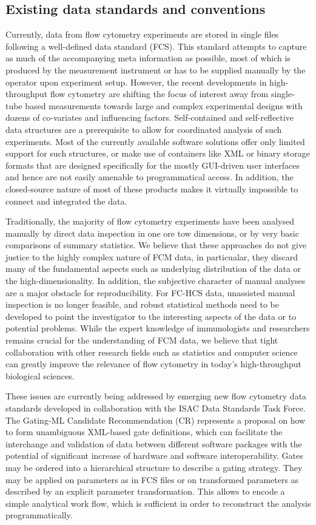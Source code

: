 \documentclass[12pt]{article}
\begin{document}
\subsection*{Existing data standards and conventions}
Currently, data from flow cytometry experiments are stored in single
files following a well-defined data standard (FCS). This standard
attempts to capture as much of the accompanying meta information as
possible, most of which is produced by the measurement instrument or
has to be supplied manually by the operator upon experiment
setup. However, the recent developments in high-throughput flow
cytometry are shifting the focus of interest away from single-tube
based measurements towards large and complex experimental designs with
dozens of co-variates and influencing factors. Self-contained and
self-reflective data structures are a prerequisite to allow for
coordinated analysis of such experiments. Most of the currently
available software solutions offer only limited support for such
structures, or make use of containers like XML or binary storage
formats that are designed specifically for the mostly GUI-driven user
interfaces and hence are not easily amenable to programmatical
access. In addition, the closed-source nature of most of these
products makes it virtually impossible to connect and integrated the
data.

Traditionally, the majority of flow cytometry experiments have been
analysed manually by direct data inspection in one ore tow dimensions,
or by very basic comparisons of summary statistics. We believe that
these approaches do not give justice to the highly complex nature of
FCM data, in particualar, they discard many of the fundamental aspects
such as underlying distribution of the data or the
high-dimensionality. In addition, the subjective character of manual
analyses are a major obstacle for reproducibility. For FC-HCS data,
unassisted manual inspection is no longer feasible, and robust
statistical methods need to be developed to point the investigator to
the interesting aspects of the data or to potential problems. While
the expert knowledge of immunologists and researchers remains crucial
for the understanding of FCM data, we believe that tight collaboration
with other research fields such as statistics and computer science can
greatly improve the relevance of flow cytometry in today's
high-throughput biological sciences.

These issues are currently being addressed by emerging new flow
cytometry data standards developed in collaboration with the ISAC Data
Standards Task Force.  The Gating-ML Candidate Recommendation (CR)
represents a proposal on how to form unambiguous XML-based gate
definitions, which can facilitate the interchange and validation of
data between different software packages with the potential of
significant increase of hardware and software interoperability. Gates
may be ordered into a hierarchical structure to describe a gating
strategy. They may be applied on parameters as in FCS files or on
transformed parameters as described by an explicit parameter
transformation. This allows to encode a simple analytical work flow,
which is sufficient in order to reconstruct the analysis
programmatically. 
\end{document}
